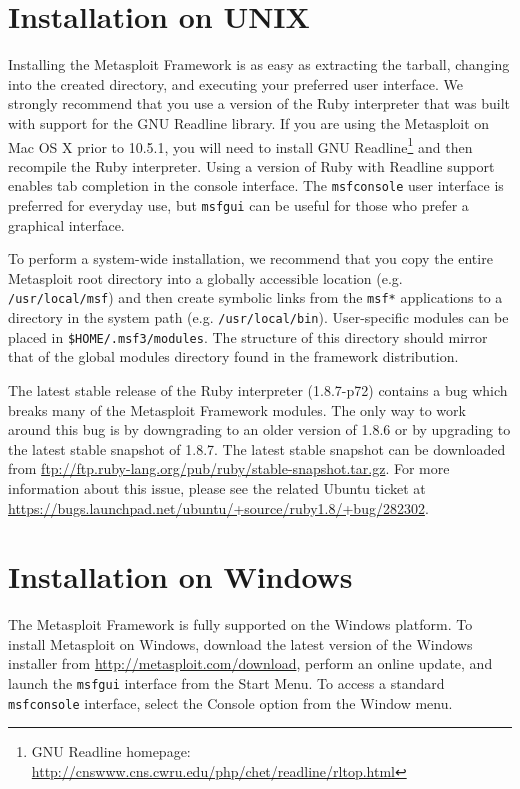 \documentclass{report}
\begin{document}
    \section{Installation on UNIX}
    \label{INSTALL-UNIX}

\par
Installing the Metasploit Framework is as easy as extracting the tarball,
changing into the created directory, and executing your preferred user
interface. We strongly recommend that you use a version of the Ruby interpreter
that was built with support for the GNU Readline library. If you are using the
Metasploit on Mac OS X prior to 10.5.1, you will need to install GNU
Readline\footnote{GNU Readline homepage:
\url{http://cnswww.cns.cwru.edu/php/chet/readline/rltop.html}} and then
recompile the Ruby interpreter. Using a version of Ruby with Readline support
enables tab completion in the console interface. The \texttt{msfconsole} user
interface is preferred for everyday use, but \texttt{msfgui} can be useful for
those who prefer a graphical interface.

\par
To perform a system-wide installation, we recommend that you copy the entire
Metasploit root directory into a globally accessible location (e.g.
\texttt{/usr/local/msf}) and then create symbolic links from the \texttt{msf*}
applications to a directory in the system path (e.g. \texttt{/usr/local/bin}).
User-specific modules can be placed in \texttt{\$HOME/.msf3/modules}. The
structure of this directory should mirror that of the global modules directory
found in the framework distribution.

\par
The latest stable release of the Ruby interpreter (1.8.7-p72) contains a bug
which breaks many of the Metasploit Framework modules. The only way to work
around this bug is by downgrading to an older version of 1.8.6 or by upgrading
to the latest stable snapshot of 1.8.7. The latest stable snapshot can be
downloaded from \url{ftp://ftp.ruby-lang.org/pub/ruby/stable-snapshot.tar.gz}.
For more information about this issue, please see the related Ubuntu ticket at
\url{https://bugs.launchpad.net/ubuntu/+source/ruby1.8/+bug/282302}.

    \section{Installation on Windows}
    \label{INSTALL-WIN32}

\par
The Metasploit Framework is fully supported on the Windows platform. To install
Metasploit on Windows, download the latest version of the Windows installer from
\url{http://metasploit.com/download}, perform an online update, and launch the
\texttt{msfgui} interface from the Start Menu. To access a standard
\texttt{msfconsole} interface, select the Console option from the Window menu.
\end{document}
